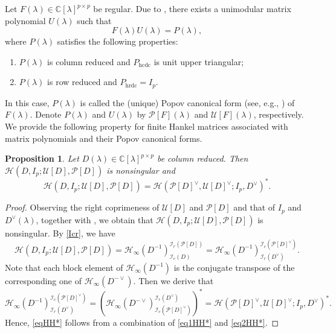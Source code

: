\documentclass[12pt,reqno]{amsart}
\theoremstyle{plain}
\newtheorem{proposition}[theorem]{Proposition}
\numberwithin{equation}{section}
\theoremstyle{remark}
\begin{document}
 Let $F(\lambda)\in \mathbb{C}[\lambda]^{p\times p}$ be regular. Due to \cite[Lemma 14 (4)]{BPV1999}, there exists a unimodular matrix polynomial $U(\lambda)$ such that $$F(\lambda)U(\lambda)=P(\lambda),$$ where $P(\lambda)$ satisfies the following properties:
\begin{enumerate}
    \item[{\rm (i)}] $P(\lambda)$ is column reduced and $P_{\mathrm{hcdc}}$ is unit upper triangular;
    \item[{\rm (ii)}] $P(\lambda)$ is row reduced and $P_{\mathrm{hrdc}}=I_p$.
\end{enumerate} 
In this case, $P(\lambda)$ is called the (unique) Popov canonical form (see, e.g., \cite[Definition 15]{BPV1999}) of $F(\lambda)$. Denote $P(\lambda)$ and $U(\lambda)$ by $\mathscr {P}[F](\lambda)$ and $\mathscr {U}[F](\lambda)$, respectively. We provide the following property for finite Hankel matrices associated with matrix polynomials and their Popov canonical forms.
 
\begin{proposition}\label{ProHH*}
Let $D(\lambda)\in \mathbb C[\lambda]^{p\times p}$ be column reduced. Then $\mathscr{H}(D,I_p;\mathscr U[D],\mathscr P[D])$ is nonsingular and 
\begin{equation}\label{eqHH*}
\mathscr{H}(D,I_p;\mathscr U[D],\mathscr P[D])=\mathscr{H}(\mathscr P[D]^{\vee},\mathscr U[D]^{\vee};I_p,D^{\vee})^*.
\end{equation}
\end{proposition}

\begin{proof}
Observing the right coprimeness of $\mathscr U[D]$ and $\mathscr P[D]$ and that of $I_p$ and $D^{\vee}(\lambda)$, together with \cite[Remark 15]{BPV}, we obtain that $\mathscr{H}(D,I_p;\mathscr U[D],\mathscr P[D])$ is nonsingular. 
By \eqref{Icr}, we have
\begin{equation}\label{eq1HH*}
\mathscr{H}(D,I_p;\mathscr U[D],\mathscr P[D])=\mathscr{H}_{\infty}(D^{-1})^{\mathcal I_r(\mathscr P[D])}_{\mathcal I_c(D)}=\mathscr{H}_{\infty}(D^{-1})^{\mathcal I_c(\mathscr P[D]^{\vee})}_{\mathcal I_r(D^{\vee})}.
\end{equation}
Note that each block element of $\mathscr{H}_{\infty}(D^{-1})$ is the conjugate transpose of the corresponding one of  $\mathscr{H}_{\infty}(D^{-\vee})$. Then we derive that
\begin{equation}\label{eq2HH*}
\mathscr{H}_{\infty}(D^{-1})^{\mathcal I_c(\mathscr P[D]^{\vee})}_{\mathcal I_r(D^{\vee})}
=\left(\mathscr{H}_{\infty}(D^{-\vee})^{\mathcal I_r(D^{\vee})}_{\mathcal I_c(\mathscr P[D]^{\vee})}\right)^*=\mathscr{H}(\mathscr P[D]^{\vee},\mathscr U[D]^{\vee};I_p,D^{\vee})^*.
\end{equation}
Hence, \eqref{eqHH*} follows from a combination of \eqref{eq1HH*} and \eqref{eq2HH*}.
\end{proof}
\end{document}
